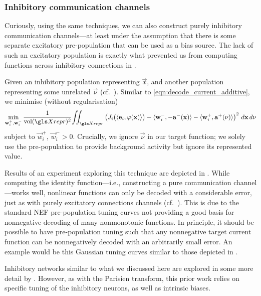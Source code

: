 \subsubsection{Inhibitory communication channels}
Curiously, using the same techniques, we can also construct purely inhibitory communication channels---at least under the assumption that there is some separate excitatory pre-population that can be used as a bias source.
The lack of such an excitatory population is exactly what prevented us from computing functions across inhibitory connections in .

Given an inhibitory population representing $\vec x$, and another population representing some unrelated $\vec \nu$ (cf.~).
Similar to \cref{eqn:decode_current_additive}, we minimise (without regularisation)
\begin{align}
	\min_{\vec w_i^+, \vec w_i^-}
	\frac{1}{\vol(\Xrepr)^2} \! \iint_{\Xrepr}
	\left(
		J_i\bigl(\langle \vec e_i, \phi(\vec x) \rangle\bigr)
		- \langle \vec w^-_i, -\vec a^-(\vec x) \rangle
		- \langle \vec w^+_i, \vec a^+(\vec \nu) \rangle
	\right)^2 \, d\vec x \, d\vec \nu %
	\label{eqn:inhibitory_communication_channel}
\end{align}
subject to $\vec w_{i}^+$, $\vec w_{i}^- > 0$.
Crucially, we ignore $\vec \nu$ in our target function; we solely use the pre-population to provide background activity but ignore its represented value.

Results of an experiment exploring this technique are depicted in .
While computing the identity function---i.e., constructing a pure communication channel---works well, nonlinear functions can only be decoded with a considerable error, just as with purely excitatory connections channels (cf.~).
This is due to the standard NEF pre-population tuning curves not providing a good basis for nonnegative decoding of many nonmonotonic functions.
In principle, it should be possible to have pre-population tuning such that any nonnegative target current function can be nonnegatively decoded with an arbitrarily small error.
An example would be this Gaussian tuning curves similar to those depicted in .

Inhibitory networks similar to what we discussed here are explored in some more detail by \citet{tripp2016function}.
However, as with the Parisien transform, this prior work relies on specific tuning of the inhibitory neurons, as well as intrinsic biases.

